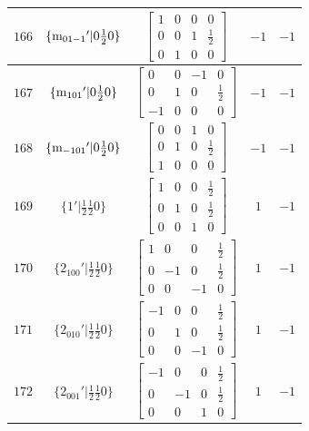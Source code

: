 \documentclass[fleqn,8pt]{jsarticle}
\begin{document}
\begin{longtable}{ccccc}
$ 166 $ & $ \{{\rm m}_{01-1}{}'|0 \frac{1}{2} 0\} $ & $ \begin{bmatrix} 1 & 0 & 0 & 0 \\ 0 & 0 & 1 & \frac{1}{2} \\ 0 & 1 & 0 & 0 \end{bmatrix} $ & $ -1 $ & $ -1 $ \\ \hline
$ 167 $ & $ \{{\rm m}_{101}{}'|0 \frac{1}{2} 0\} $ & $ \begin{bmatrix} 0 & 0 & -1 & 0 \\ 0 & 1 & 0 & \frac{1}{2} \\ -1 & 0 & 0 & 0 \end{bmatrix} $ & $ -1 $ & $ -1 $ \\ \hline
$ 168 $ & $ \{{\rm m}_{-101}{}'|0 \frac{1}{2} 0\} $ & $ \begin{bmatrix} 0 & 0 & 1 & 0 \\ 0 & 1 & 0 & \frac{1}{2} \\ 1 & 0 & 0 & 0 \end{bmatrix} $ & $ -1 $ & $ -1 $ \\ \hline
$ 169 $ & $ \{1{}'|\frac{1}{2} \frac{1}{2} 0\} $ & $ \begin{bmatrix} 1 & 0 & 0 & \frac{1}{2} \\ 0 & 1 & 0 & \frac{1}{2} \\ 0 & 0 & 1 & 0 \end{bmatrix} $ & $ 1 $ & $ -1 $ \\ \hline
$ 170 $ & $ \{2{}_{100}{}'|\frac{1}{2} \frac{1}{2} 0\} $ & $ \begin{bmatrix} 1 & 0 & 0 & \frac{1}{2} \\ 0 & -1 & 0 & \frac{1}{2} \\ 0 & 0 & -1 & 0 \end{bmatrix} $ & $ 1 $ & $ -1 $ \\ \hline
$ 171 $ & $ \{2{}_{010}{}'|\frac{1}{2} \frac{1}{2} 0\} $ & $ \begin{bmatrix} -1 & 0 & 0 & \frac{1}{2} \\ 0 & 1 & 0 & \frac{1}{2} \\ 0 & 0 & -1 & 0 \end{bmatrix} $ & $ 1 $ & $ -1 $ \\ \hline
$ 172 $ & $ \{2{}_{001}{}'|\frac{1}{2} \frac{1}{2} 0\} $ & $ \begin{bmatrix} -1 & 0 & 0 & \frac{1}{2} \\ 0 & -1 & 0 & \frac{1}{2} \\ 0 & 0 & 1 & 0 \end{bmatrix} $ & $ 1 $ & $ -1 $ \\ \hline

\end{longtable}
\end{document}
